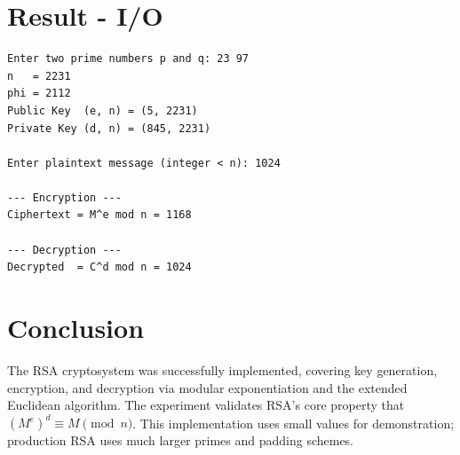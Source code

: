 \section{Result - I/O}
\begin{verbatim}
Enter two prime numbers p and q: 23 97
n   = 2231
phi = 2112
Public Key  (e, n) = (5, 2231)
Private Key (d, n) = (845, 2231)

Enter plaintext message (integer < n): 1024

--- Encryption ---
Ciphertext = M^e mod n = 1168

--- Decryption ---
Decrypted  = C^d mod n = 1024
\end{verbatim}

\section{Conclusion}
The RSA cryptosystem was successfully implemented, covering key generation,
encryption, and decryption via modular exponentiation and the extended Euclidean
algorithm. The experiment validates RSA's core property that
$(M^e)^d \equiv M \pmod{n}$. This implementation uses small values for
demonstration; production RSA uses much larger primes and padding schemes.
